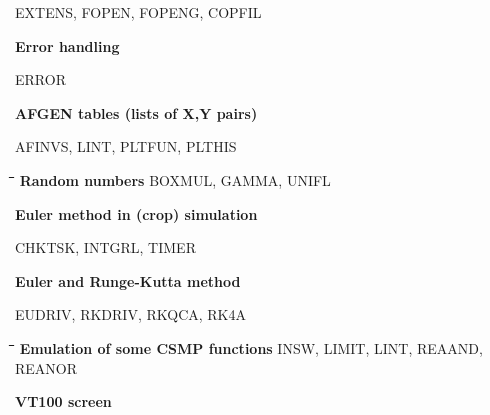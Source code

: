 \documentclass[11pt]{article}
\begin{document}
\begin{indenting}{6.35cm}
EXTENS, FOPEN, FOPENG, COPFIL
\end{indenting}
{\bf Error handling}
\testlastline

\begin{indenting}{6.35cm}
ERROR
\end{indenting}
{\bf AFGEN tables (lists of X,Y pairs)}
\testlastline

\begin{indenting}{6.35cm}
AFINVS, LINT, PLTFUN, PLTHIS
\end{indenting}
\begin{tabbing}
\hspace{1.27cm}\=\hspace{1.27cm}\=\hspace{1.27cm}\=\hspace{1.27cm}\=%
\hspace{1.27cm}\=\hspace{1.27cm}\=\hspace{1.27cm}\=\hspace{1.27cm}\=%
\hspace{1.27cm}\=\hspace{1.27cm}\=\kill
{\bf Random numbers}\> \> \> \> \> BOXMUL, GAMMA, UNIFL
\end{tabbing}
{\bf Euler method in (crop) simulation}
\testlastline

\begin{indenting}{6.35cm}
CHKTSK, INTGRL, TIMER
\end{indenting}
{\bf Euler and Runge-Kutta method}
\testlastline

\begin{indenting}{6.35cm}
EUDRIV, RKDRIV, RKQCA, RK4A
\end{indenting}
\begin{tabbing}
\hspace{1.27cm}\=\hspace{1.27cm}\=\hspace{1.27cm}\=\hspace{1.27cm}\=%
\hspace{1.27cm}\=\hspace{1.27cm}\=\hspace{1.27cm}\=\hspace{1.27cm}\=%
\hspace{1.27cm}\=\hspace{1.27cm}\=\kill
{\bf Emulation of some CSMP functions}\> \> \> \> \> INSW, LIMIT, LINT, REAAND, REA\-NOR
\end{tabbing}
{\bf VT100 screen}
\testlastline
\end{document}
